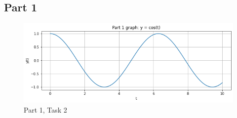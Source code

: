 \documentclass[12pt]{report}
\begin{document}
\subsection{Part 1}
\begin{figure}[h!]
\begin{center}
\caption{Part 1, Task 2}
\includegraphics[scale=0.65]{Part1Task.png}
\end{center}
\end{figure}
\newpage
\end{document}
